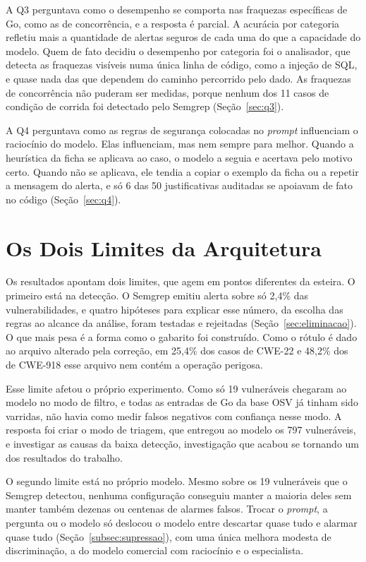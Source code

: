 A Q3 perguntava como o desempenho se comporta nas fraquezas específicas de Go, como as de concorrência, e a resposta é parcial. A acurácia por categoria refletiu mais a quantidade de alertas seguros de cada uma do que a capacidade do modelo. Quem de fato decidiu o desempenho por categoria foi o analisador, que detecta as fraquezas visíveis numa única linha de código, como a injeção de SQL, e quase nada das que dependem do caminho percorrido pelo dado. As fraquezas de concorrência não puderam ser medidas, porque nenhum dos 11 casos de condição de corrida foi detectado pelo Semgrep (Seção~\ref{sec:q3}).

A Q4 perguntava como as regras de segurança colocadas no \textit{prompt} influenciam o raciocínio do modelo. Elas influenciam, mas nem sempre para melhor. Quando a heurística da ficha se aplicava ao caso, o modelo a seguia e acertava pelo motivo certo. Quando não se aplicava, ele tendia a copiar o exemplo da ficha ou a repetir a mensagem do alerta, e só 6 das 50 justificativas auditadas se apoiavam de fato no código (Seção~\ref{sec:q4}).

\section{Os Dois Limites da Arquitetura}
\label{sec:doislimites}

Os resultados apontam dois limites, que agem em pontos diferentes da esteira. O primeiro está na detecção. O Semgrep emitiu alerta sobre só 2,4\% das vulnerabilidades, e quatro hipóteses para explicar esse número, da escolha das regras ao alcance da análise, foram testadas e rejeitadas (Seção~\ref{sec:eliminacao}). O que mais pesa é a forma como o gabarito foi construído. Como o rótulo é dado ao arquivo alterado pela correção, em 25,4\% dos casos de CWE-22 e 48,2\% dos de CWE-918 esse arquivo nem contém a operação perigosa.

Esse limite afetou o próprio experimento. Como só 19 vulneráveis chegaram ao modelo no modo de filtro, e todas as entradas de Go da base OSV já tinham sido varridas, não havia como medir falsos negativos com confiança nesse modo. A resposta foi criar o modo de triagem, que entregou ao modelo os 797 vulneráveis, e investigar as causas da baixa detecção, investigação que acabou se tornando um dos resultados do trabalho.

O segundo limite está no próprio modelo. Mesmo sobre os 19 vulneráveis que o Semgrep detectou, nenhuma configuração conseguiu manter a maioria deles sem manter também dezenas ou centenas de alarmes falsos. Trocar o \textit{prompt}, a pergunta ou o modelo só deslocou o modelo entre descartar quase tudo e alarmar quase tudo (Seção~\ref{subsec:supressao}), com uma única melhora modesta de discriminação, a do modelo comercial com raciocínio e o especialista.

